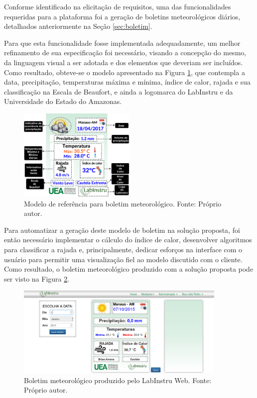 Conforme identificado na elicitação de requisitos, uma das funcionalidades requeridas para a plataforma foi a geração de boletins meteorológicos diários, detalhados anteriormente na Seção \ref{sec:boletim}.

Para que esta funcionalidade fosse implementada adequadamente, um melhor refinamento de sua especificação foi necessário, visando a concepção do mesmo, da linguagem visual a ser adotada e dos elementos que deveriam ser incluídos. Como resultado, obteve-se o modelo apresentado na Figura \ref{fig:modeloBoletim}, que contempla a data, precipitação, temperaturas máxima e mínima, índice de calor, rajada e sua classificação na Escala de Beaufort, e ainda a logomarca do LabInstru e da Universidade do Estado do Amazonas.

\begin{figure}[h!]
	\centering
	\includegraphics[width=0.5\textwidth]{./img/esbocoBoletim.png}
	\caption{Modelo de referência para boletim meteorológico. Fonte: Próprio autor.} \label{fig:modeloBoletim}
\end{figure}

Para automatizar a geração deste modelo de boletim na solução proposta, foi então necessário implementar o cálculo do índice de calor, desenvolver algoritmos para classificar a rajada e, principalmente, dedicar esforços na interface com o usuário para permitir uma visualização fiel ao modelo discutido com o cliente. Como resultado, o boletim meteorológico produzido com a solução proposta pode ser visto na Figura \ref{fig:boletim}.

\begin{figure}[h!]
	\centering
	\includegraphics[width=0.9\textwidth]{./img/boletim.png}
	\caption{Boletim meteorológico produzido pelo LabInstru Web. Fonte: Próprio autor.} \label{fig:boletim}
\end{figure}
